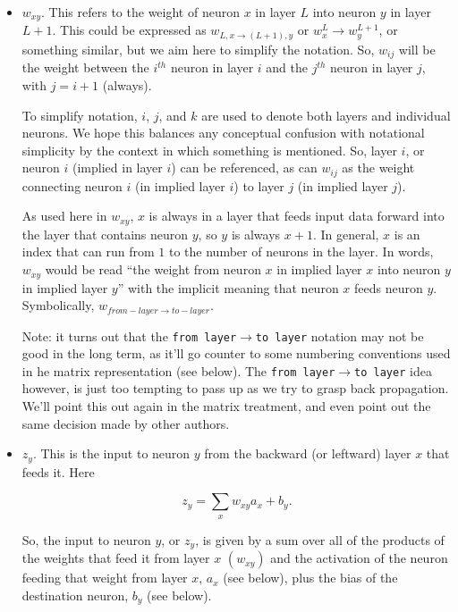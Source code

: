 \documentclass[12pt]{article}
\begin{document}
\begin{itemize}

\item $w_{xy}$. This refers to the weight of neuron $x$ in layer $L$ into neuron $y$ in layer $L+1$.  This could be expressed as $w_{L,x\rightarrow(L+1),y}$ or $w^{L}_x\rightarrow w^{L+1}_y$, or something similar, but we aim here to simplify the notation. So, $w_{ij}$ will be the weight between the $i^{th}$ neuron in layer $i$ and the $j^{th}$ neuron in layer $j$, with $j=i+1$ (always).  

To simplify notation, $i$, $j$, and $k$ are used to denote both layers and individual neurons.  We hope this balances any conceptual confusion with notational simplicity by the context in which something is mentioned.  So, layer $i$, or neuron $i$ (implied in layer $i$) can be referenced, as can $w_{ij}$ as the weight connecting neuron $i$ (in implied layer $i$) to layer $j$ (in implied layer $j$).

As used here in $w_{xy}$, $x$ is always in a layer that feeds input data forward into the layer that contains neuron $y$, so $y$ is always $x+1$.  In general, $x$ is an index that can run from $1$ to the number of neurons in the layer. In words, $w_{xy}$ would be read ``the weight from neuron $x$ in implied layer $x$ into neuron $y$ in implied layer $y$'' with the implicit meaning that neuron $x$ feeds neuron $y$.  Symbolically, $w_{from-layer\rightarrow to-layer}$.

Note: it turns out that the {\tt from layer}$\rightarrow${\tt to layer} notation may not be good in the long term, as it'll go counter to some numbering conventions used in he matrix representation (see below). The {\tt from layer}$\rightarrow${\tt to layer} idea however, is just too tempting to pass up as we try to grasp back propagation.  We'll point this out again in the matrix treatment, and even point out the same decision made by other authors.

\item $z_{y}$. This is the input to neuron $y$ from the backward (or leftward) layer $x$ that feeds it. Here

\begin{equation}
z_y = \sum_x w_{xy} a_x + b_y.
\label{eqn_zy}
\end{equation}

So,  the input to neuron $y$, or $z_y$, is given by a sum over all of the products of the weights that feed it from layer $x$ $(w_{xy})$ and the activation of the neuron feeding that weight from layer $x$, $a_x$ (see below), plus the bias of the destination neuron, $b_y$ (see below).


\end{itemize}
\end{document}
